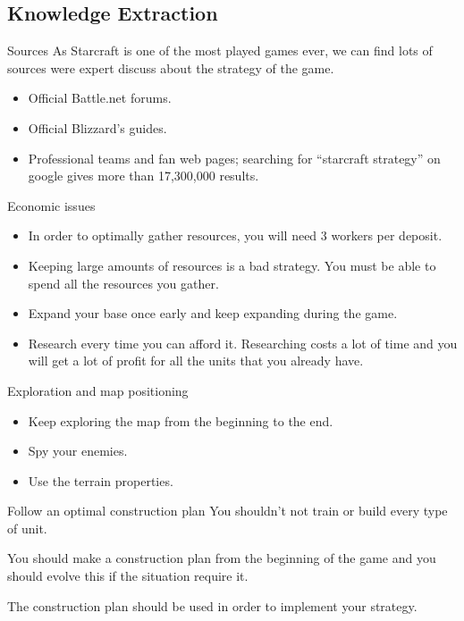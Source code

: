 \documentclass[10pt]{beamer}
\begin{document}
\subsection{Knowledge Extraction}

\begin{frame}{Sources}
As Starcraft is one of the most played games ever, we can find lots of sources were expert discuss about the strategy of the game.
\begin{itemize}
 \item Official Battle.net forums.
 \item Official Blizzard's guides.
 \item Professional teams and fan web pages; searching for ``starcraft strategy'' on google gives more than 17,300,000 results.
\end{itemize}

\end{frame}

\begin{frame} {Economic issues}
	\begin{itemize}
	\item In order to optimally gather resources, you will need 3 workers per deposit.

        \item Keeping large amounts of resources is a bad strategy. You must be able to spend all the resources you gather.

	\item Expand your base once early and keep expanding during the game.

	\item Research every time you can afford it. Researching costs a lot of time and you will get a lot of profit for all the units that you already have.
\end{itemize}
\end{frame}

\begin{frame}{Exploration and map positioning}
     \begin{itemize}
     \item Keep exploring the map from the beginning to the end.
     \item Spy your enemies.
     \item Use the terrain properties.
    \end{itemize}
\end{frame}

\begin{frame}{Follow an optimal construction plan}
 You shouldn't not train or build every type of unit.
 \newline

  You should make a construction plan from the beginning of the game and you should evolve this if the situation require it. 
\newline

The construction plan should be used in order to implement your strategy.
\end{frame}
\end{document}
